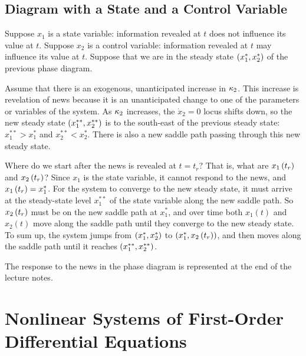 \documentclass[letterpaper,12pt,leqno]{article}
\begin{document}
\subsection{Diagram with a State and a Control Variable}

Suppose $x_{1}$ is a state variable: information revealed at $t$ does not influence its value at $t$. Suppose $x_{2}$ is a control variable: information revealed at $t$ may influence its value at $t$. Suppose that we are in the steady state $\left( x_{1}^{*},x_{2}^{*} \right)$ of the previous phase diagram.

Assume that there is an exogenous, unanticipated increase in $\kappa_{2}$. This increase is revelation of news because it is an unanticipated change to one of the parameters or variables of the system. As $\kappa_{2}$ increases, the $\dot{x}_{2}=0$ locus shifts down, so the new steady state $\left( x_{1}^{* *},x_{2}^{* *} \right) $ is to the south-east of the previous steady state: $x_{1}^{* *}>x_{1}^{*}$ and $x_{2}^{* *}<x_{2}^{*}.$ There is also a new saddle path passing through this new steady state.

Where do we start after the news is revealed at $t=t_{r}$? That is, what are $x_{1}\left( t_{r} \right)$ and $x_{2}\left( t_{r} \right)$? Since $x_{1}$ is the state variable, it cannot respond to the news, and $x_{1}\left( t_{r} \right) =x_{1}^{*}$. For the system to
converge to the new steady state, it must arrive at the steady-state level $x_{1}^{* *}$ of the state variable along the new saddle path. So $x_{2}\left( t_{r} \right) $ must be on the new saddle path at $x_{1}^{*}$, and over time both $x_{1}(t) $ and $x_{2}(t) $ move along the saddle path until they converge to the new steady state. To sum up, the system jumps from $\left( x_{1}^{*},x_{2}^{*} \right)$ to $\left( x_{1}^{*},x_{2}\left( t_{r} \right) \right) $, and then moves along the saddle path until it reaches $\left( x_{1}^{* *},x_{2}^{* *} \right)$.

The response to the news in the phase diagram is represented at the end of the lecture notes.

\section{Nonlinear Systems of First-Order Differential Equations}
\end{document}
